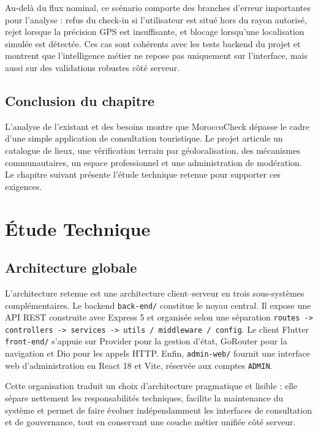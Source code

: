 ﻿\documentclass[12pt,a4paper]{report}
\begin{document}
Au-del\`a du flux nominal, ce sc\'enario comporte des branches d'erreur importantes pour l'analyse : refus du check-in si l'utilisateur est situ\'e hors du rayon autoris\'e, rejet lorsque la pr\'ecision GPS est insuffisante, et blocage lorsqu'une localisation simul\'ee est d\'etect\'ee. Ces cas sont coh\'erents avec les tests backend du projet et montrent que l'intelligence m\'etier ne repose pas uniquement sur l'interface, mais aussi sur des validations robustes c\^ot\'e serveur.

\section{Conclusion du chapitre}
L'analyse de l'existant et des besoins montre que MoroccoCheck d\'epasse le cadre d'une simple application de consultation touristique. Le projet articule un catalogue de lieux, une v\'erification terrain par g\'eolocalisation, des m\'ecanismes communautaires, un espace professionnel et une administration de mod\'eration. Le chapitre suivant pr\'esente l'\'etude technique retenue pour supporter ces exigences.

\chapter{\'Etude Technique}

\section{Architecture globale}
L'architecture retenue est une architecture client--serveur en trois sous-syst\`emes compl\'ementaires. Le backend \texttt{back-end/} constitue le noyau central. Il expose une API REST construite avec Express 5 et organis\'ee selon une s\'eparation \texttt{routes -> controllers -> services -> utils / middleware / config}. Le client Flutter \texttt{front-end/} s'appuie sur Provider pour la gestion d'\'etat, GoRouter pour la navigation et Dio pour les appels HTTP. Enfin, \texttt{admin-web/} fournit une interface web d'administration en React 18 et Vite, r\'eserv\'ee aux comptes \texttt{ADMIN}.

Cette organisation traduit un choix d'architecture pragmatique et lisible : elle s\'epare nettement les responsabilit\'es techniques, facilite la maintenance du syst\`eme et permet de faire \'evoluer ind\'ependamment les interfaces de consultation et de gouvernance, tout en conservant une couche m\'etier unifi\'ee c\^ot\'e serveur.
\end{document}
